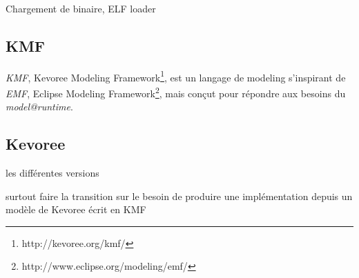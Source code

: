 Chargement de binaire, ELF loader

\subsection{KMF}

\emph{KMF}, Kevoree Modeling Framework\footnote{http://kevoree.org/kmf/}, est un langage de modeling s'inspirant de \emph{EMF}, Eclipse Modeling Framework\footnote{http://www.eclipse.org/modeling/emf/}, mais conçut pour répondre aux besoins du \emph{model@runtime}.

\subsection{Kevoree}

les différentes versions

surtout faire la transition sur le besoin de produire une implémentation depuis un modèle de Kevoree écrit en KMF